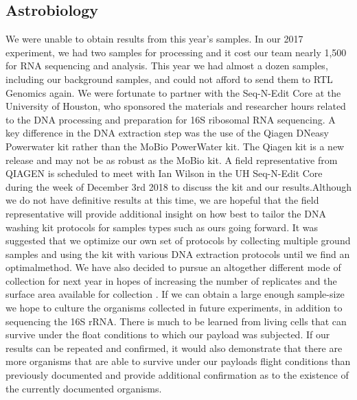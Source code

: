 \subsection{Astrobiology}
\label{sec:Astrobiology Results Discussion}

We were unable to obtain results from this year’s samples.  In our 2017 experiment, we had two samples for processing and it cost our team nearly 1,500 for RNA sequencing and analysis. This year we had almost a dozen samples, including our background samples, and could not afford to send them to RTL Genomics again. We were fortunate to partner with the Seq-N-Edit Core at the University of Houston, who sponsored the materials and researcher hours related to the DNA processing and preparation for 16S ribosomal RNA sequencing.  A key difference in the DNA extraction step was the use of the Qiagen DNeasy Powerwater kit rather than the MoBio PowerWater kit.  The Qiagen kit is a new release and may not be as robust as the MoBio kit. A field representative from QIAGEN is scheduled to meet with Ian Wilson in the UH Seq-N-Edit Core during the week of December 3rd 2018 to discuss the kit and our results.Although we do not have definitive results at this time, we are hopeful that the field representative will provide additional insight on how best to tailor the DNA washing kit protocols for samples types such as ours going forward. It was suggested that we optimize our own set of protocols by collecting multiple ground samples and using the kit with various DNA extraction protocols until we find an optimalmethod.  We have also decided to pursue an altogether different mode of collection for next year in hopes of increasing the number of replicates and the surface area available for collection . If we can obtain a large enough sample-size we hope to culture the organisms collected in future experiments, in addition to sequencing the 16S rRNA. There is much to be learned from living cells that can survive under the ﬂoat conditions to which our payload was subjected. If our results can be repeated and conﬁrmed, it would also demonstrate that there are more organisms that are able to survive under our payloads ﬂight conditions than previously documented and provide additional confirmation as to the existence of the currently documented organisms.

